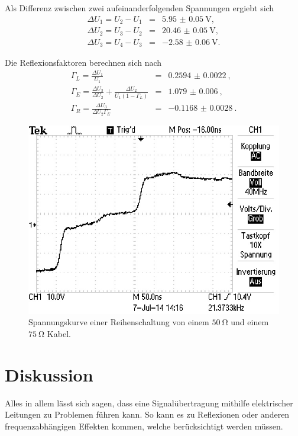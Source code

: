 Als Differenz zwischen zwei aufeinanderfolgenden Spannungen ergiebt sich
\begin{eqnarray*}
	\Delta U_1 = U_2 - U_1 &=& \SI{5.95(5)}{\volt},\\
	\Delta U_2 = U_3 - U_2 &=& \SI{20.46(5)}{\volt},\\
	\Delta U_3 = U_4 - U_3 &=& \SI{-2.58(6)}{\volt}.
\end{eqnarray*}

Die Reflexionsfaktoren berechnen sich nach
\begin{eqnarray*}
	\Gamma_L = \frac{\Delta U_1}{U_1} &=& \SI{0.2594(22)}{},\\
	\Gamma_E = \frac{\Delta U_3}{\Delta U_2} + \frac{\Delta U_2}{U_1(1-\Gamma_L)} &=& \SI{1.079(6)}{},\\
	\Gamma_R = \frac{\Delta U_3}{\Delta U_2 \Gamma_E} &=& \SI{-0.1168(28)}{}.
\end{eqnarray*}

\begin{figure}
	\centering
	\includegraphics[width = 12cm]{data/e/ALL0008/F0008TEK.JPG}
	\caption{Spannungskurve einer Reihenschaltung von einem $\SI{50}{\ohm}$ und einem $\SI{75}{\ohm}$ Kabel.}
	\label{fig_abs10}
\end{figure}

\FloatBarrier
\section{Diskussion} %
\label{sec:diskussion}

Alles in allem lässt sich sagen, dass eine Signalübertragung mithilfe elektrischer Leitungen zu Problemen führen kann. 
So kann es zu Reflexionen oder anderen frequenzabhängigen Effekten kommen, welche berücksichtigt werden müssen.

